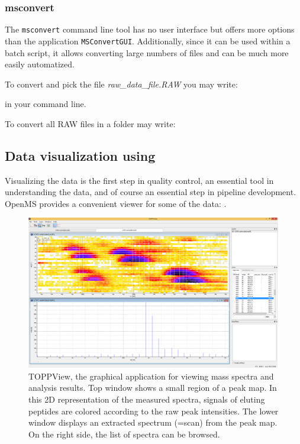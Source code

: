 \subsubsection{msconvert}
The \texttt{msconvert} command line tool has no user interface but offers more options than the application \texttt{MSConvertGUI}. Additionally, since it can be used within a batch script, it allows converting large numbers of files and can be much more easily automatized.

\noindent To convert and pick the file \textit{raw\_data\_file.RAW} you may write:

\noindent{}

\noindent in your command line.

\noindent To convert all RAW files in a folder may write:

\noindent{}




\subsection{Data visualization using }
\label{Data_Visualization}

Visualizing the data is the first step in quality control, an essential tool in understanding the data, and of course an essential step in pipeline development.
OpenMS provides a convenient viewer for some of the data: .

\begin{figure}
\includegraphics[width=\textwidth]{graphics/introduction/TOPPView.png}
\caption{TOPPView, the graphical application for viewing mass spectra and analysis results. Top window shows a small region of a peak map. In this 2D representation of the measured spectra, signals of eluting peptides are colored according to the raw peak intensities. The lower window displays an extracted spectrum (=scan) from the peak map. On the right side, the list of spectra can be browsed.}
\label{fig:toppview}
\end{figure}

